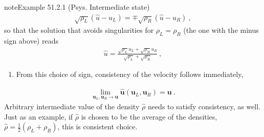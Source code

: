 \documentclass[letterpaper,10pt,english]{jupyterBook}
\begin{document}
\begin{sphinxadmonition}{note}{Example 51.2.1 (P\sphinxhyphen{}sys. Intermediate state)}
\begin{equation*}
\begin{split}\sqrt{\rho_L} ( \hat{u} - u_L ) = \mp \sqrt{\rho_R} (\hat{u} - u_R) \ ,\end{split}
\end{equation*}
\sphinxAtStartPar
so that the solution that avoids singularities for \(\rho_L = \rho_R\) (the one with the minus sign above) reads
\begin{equation*}
\begin{split}\hat{u} = \frac{\sqrt{\rho_L} u_L + \sqrt{\rho_R} u_R}{\sqrt{\rho_L} + \sqrt{\rho_R}} \ ,\end{split}
\end{equation*}\begin{enumerate}
%
\setcounter{enumi}{1}
\item {} 
\sphinxAtStartPar
{} From this choice of sign, consistency of the velocity follows immediately,

\end{enumerate}
\begin{equation*}
\begin{split}\lim_{\mathbf{u}_L, \mathbf{u}_R \rightarrow \mathbf{u}} \hat{\mathbf{u}}(\mathbf{u}_L, \mathbf{u}_R) = \mathbf{u} \ .\end{split}
\end{equation*}
\sphinxAtStartPar
Arbitrary intermediate value of the density \(\hat{\rho}\) needs to satisfy consistency, as well. Just as an example, if \(\hat{\rho}\) is chosen to be the average of the densities, \(\hat{\rho} = \frac{1}{2}(\rho_L + \rho_R)\), this is consistent choice.
\end{sphinxadmonition}
\label{ch/pde/fvm-hyperbolic-pde:example-1}
\end{document}
